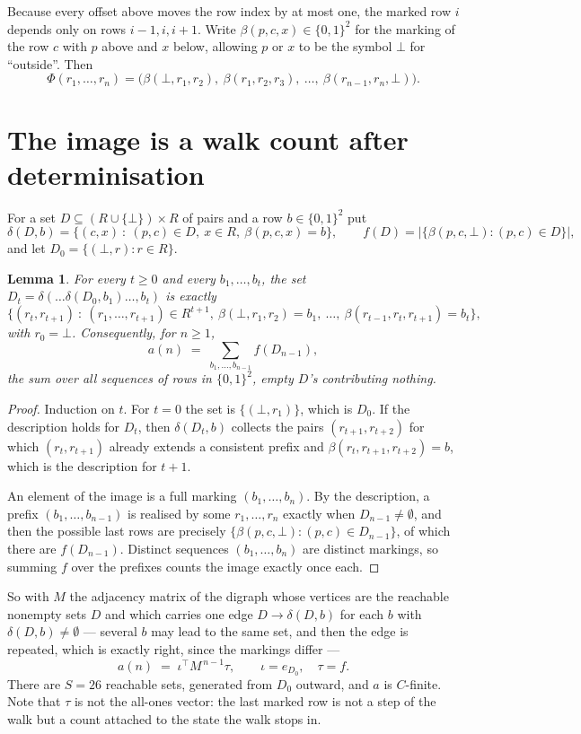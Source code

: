 \documentclass[11pt,a4paper]{article}
\theoremstyle{plain}
\newtheorem{lemma}[theorem]{Lemma}
\theoremstyle{definition}
\begin{document}
Because every offset above moves the row index by at most one, the marked row $i$ depends only
on rows $i-1,i,i+1$. Write $\beta(p,c,x)\in\{0,1\}^{2}$ for the marking of the row $c$
with $p$ above and $x$ below, allowing $p$ or $x$ to be the symbol $\bot$ for ``outside''.
Then
\[
\Phi(r_1,\dots,r_n)=\bigl(\beta(\bot,r_1,r_2),\ \beta(r_1,r_2,r_3),\ \dots,\
\beta(r_{n-1},r_n,\bot)\bigr).
\]

\section{The image is a walk count after determinisation}

For a set $D\subseteq(R\cup\{\bot\})\times R$ of pairs and a row $b\in\{0,1\}^{2}$ put
\[
\delta(D,b)=\{(c,x)\ :\ (p,c)\in D,\ x\in R,\ \beta(p,c,x)=b\},\qquad
f(D)=\bigl|\{\beta(p,c,\bot):(p,c)\in D\}\bigr| ,
\]
and let $D_0=\{(\bot,r):r\in R\}$.

\begin{lemma}\label{lem:det}
For every $t\ge0$ and every $b_1,\dots,b_t$, the set
$D_t=\delta(\dots\delta(D_0,b_1)\dots,b_t)$ is exactly
\[
\{(r_t,r_{t+1})\ :\ (r_1,\dots,r_{t+1})\in R^{t+1},\ \beta(\bot,r_1,r_2)=b_1,\ \dots,\
\beta(r_{t-1},r_t,r_{t+1})=b_t\} ,
\]
with $r_0=\bot$. Consequently, for $n\ge1$,
\[
a(n)\;=\;\sum_{b_1,\dots,b_{n-1}}f(D_{n-1}),
\]
the sum over all sequences of rows in $\{0,1\}^{2}$, empty $D$'s contributing nothing.
\end{lemma}

\begin{proof}
Induction on $t$. For $t=0$ the set is $\{(\bot,r_1)\}$, which is $D_0$. If the description
holds for $D_t$, then $\delta(D_t,b)$ collects the pairs $(r_{t+1},r_{t+2})$ for which
$(r_t,r_{t+1})$ already extends a consistent prefix and
$\beta(r_t,r_{t+1},r_{t+2})=b$, which is the description for $t+1$.

An element of the image is a full marking $(b_1,\dots,b_n)$. By the description, a prefix
$(b_1,\dots,b_{n-1})$ is realised by some $r_1,\dots,r_n$ exactly when $D_{n-1}\neq
\emptyset$, and then the possible last rows are precisely
$\{\beta(p,c,\bot):(p,c)\in D_{n-1}\}$, of which there are $f(D_{n-1})$. Distinct
sequences $(b_1,\dots,b_n)$ are distinct markings, so summing $f$ over the prefixes counts the
image exactly once each.
\end{proof}

So with $M$ the adjacency matrix of the digraph whose vertices are the reachable nonempty sets
$D$ and which carries one edge $D\to\delta(D,b)$ for each $b$ with $\delta(D,b)\neq\emptyset$
--- several $b$ may lead to the same set, and then the edge is repeated, which is exactly
right, since the markings differ ---
\[
a(n)\;=\;\iota^{\!\top}M^{\,n-1}\tau,\qquad \iota=e_{D_0},\quad \tau=f .
\]
There are $S=26$ reachable sets, generated from $D_0$ outward, and $a$ is $C$-finite. Note
that $\tau$ is not the all-ones vector: the last marked row is not a step of the walk but a
count attached to the state the walk stops in.
\end{document}
